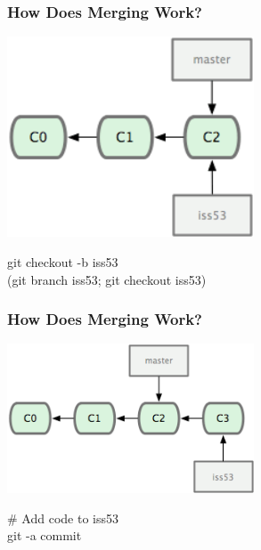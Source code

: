 \begin{frame}
\frametitle{\large How Does Merging Work?}
\begin{center}
\includegraphics[width=0.55\textwidth]{img/branching_images/f2.png}
\end{center}
\vspace{1mm}
\begin{center}
\small git checkout -b iss53 \\
\small (git branch iss53; git checkout iss53)
\end{center}
\end{frame}
\note{}

\begin{frame}
\frametitle{\large How Does Merging Work?}
\begin{center}
\includegraphics[width=0.55\textwidth]{img/branching_images/f3.png}
\end{center}
\vspace{2mm}
\begin{center}
\# Add code to iss53\\
git -a commit
\end{center}
\end{frame}
\note{}

